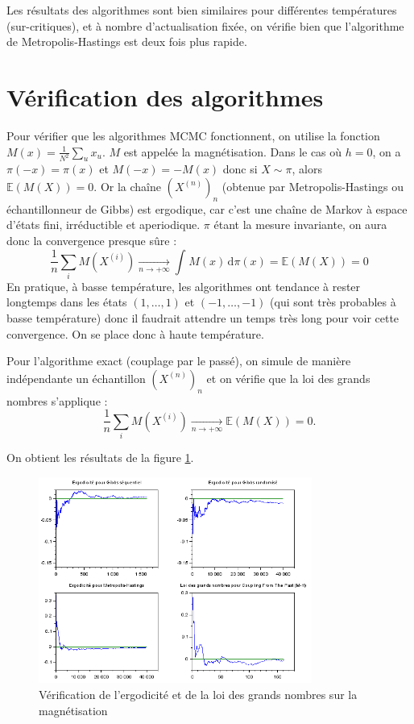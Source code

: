 \documentclass[a4paper,11pt]{article}
\begin{document}
Les résultats des algorithmes sont bien similaires pour différentes températures (sur-critiques), et à nombre d'actualisation fixée, on vérifie bien que l'algorithme de Metropolis-Hastings est deux fois plus rapide.

\section{Vérification des algorithmes}\label{sec:check}

Pour vérifier que les algorithmes MCMC fonctionnent, on utilise la fonction $M(x) = \frac{1}{N^2} \sum_u x_u$. $M$ est appelée la magnétisation. Dans le cas où $h = 0$, on a $\pi(-x) = \pi(x)$ et $M(-x) = -M(x)$ donc si $X \sim \pi$, alors $\mathbb E(M(X)) = 0$. Or la chaîne $(X^{(n)})_n$ (obtenue par Metropolis-Hastings ou échantillonneur de Gibbs) est ergodique, car c'est une chaîne de Markov à espace d'états fini, irréductible et aperiodique. $\pi$ étant la mesure invariante, on aura donc la convergence presque sûre :
$$\frac{1}{n} \sum_i M(X^{(i)}) \xrightarrow[n \rightarrow +\infty]{} \displaystyle \int_{}^{} M(x) \, \mathrm{d}\pi(x)=\mathbb E(M(X)) = 0$$
En pratique, à basse température, les algorithmes ont tendance à rester longtemps dans les états $(1,\hdots,1)$ et $(-1,\hdots,-1)$ (qui sont très probables à basse température) donc il faudrait attendre un temps très long pour voir cette convergence. On se place donc à haute température.

Pour l'algorithme exact (couplage par le passé), on simule de manière indépendante un échantillon $(X^{(n)})_n$ et on vérifie que la loi des grands nombres s'applique :
$$\frac{1}{n} \sum_i M(X^{(i)}) \xrightarrow[n \rightarrow +\infty]{} \mathbb E(M(X)) = 0.$$

On obtient les résultats de la figure \ref{fig:ergodic}.
\begin{figure}[!htbp]
	\centering
	\includegraphics[width=0.8\textwidth]{ergodicite_magnetisation.png}
	\caption{Vérification de l'ergodicité et de la loi des grands nombres sur la magnétisation}
	\label{fig:ergodic}
\end{figure}
\end{document}
